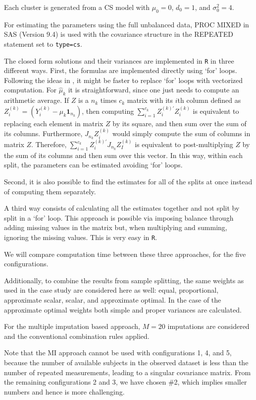 \documentclass[11pt,a5paper,twoside]{book}
\begin{document}
{Each cluster is generated from a CS model with $\mu_0=0$, $d_0=1$, and $\sigma^2_0=4$. 

For estimating the parameters using the full unbalanced data, PROC MIXED in SAS (Version 9.4) is used with the covariance structure in the REPEATED statement set to {\tt{type=cs}}.


The closed form solutions and their variances are implemented in {\tt R} in three different ways. First, the formulas  are implemented directly using `for' loops. Following the ideas in \cite{sikorska2013_2}, it might be faster to replace `for' loops with vectorized computation. For $\widehat{\mu}_k$ it is straightforward, since one just needs to compute an arithmetic average. If $Z$ is a $n_k$ times $c_k$ matrix with its $i$th column defined as $Z_i^{(k)}=\left(Y_i^{(k)} - \mu_k \mathbf{1}_{n_k} \right)$, then computing $\sum_{i=1}^ {c_k}  Z_i^{(k)'} Z_i^{(k)}$  is equivalent to replacing each element in matrix $Z$ by its square, and then sum over the sum of its columns. Furthermore, $J_{n_k} Z_i^{(k)}$ would simply compute the sum of columns in matrix $Z$. Therefore, $\sum_{i=1}^{c_k} Z_i^{(k)'} J_{n_k} Z_I^{(k)}$ is equivalent to post-multiplying $Z$ by the sum of its columns and then sum over this vector. In this way, within each split, the parameters can be estimated avoiding `for' loops. 

Second, it is also possible to find the estimates for all of the splits at once instead of computing them separately. 

A third way consists of calculating all the estimates together and not split by split in a `for' loop. This approach is possible via imposing balance through adding missing values in the matrix but, when multiplying and summing, ignoring the missing values. This is very easy in {\tt R}. 

We will compare computation time between these three approaches, for the five configurations.

Additionally, to combine the results from sample splitting, the same
weights as used in the case study are considered here as well: equal, proportional, approximate scalar, scalar, and approximate optimal. In the case of the approximate optimal weights both simple and proper variances are calculated. 

For the multiple imputation based approach, $M=20$ imputations are considered and the conventional combination rules applied.

 Note that the MI approach cannot be used with configurations 1, 4, and 5, because the number of available subjects in the observed dataset is less than the number of repeated measurements, leading to a singular covariance matrix. From the remaining configurations 2 and 3, we have chosen \#2, which implies smaller numbers and hence is more challenging.

}
\end{document}
